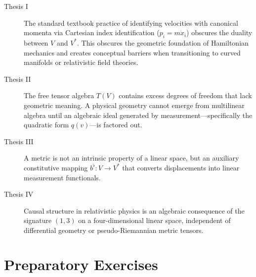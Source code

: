 \documentclass[11pt,a4paper]{article}
\begin{document}
\begin{description}
  \item[Thesis I]
    The standard textbook practice of identifying velocities with canonical
    momenta via Cartesian index identification ($p_i = m \dot{x}_i$) obscures
    the duality between $V$ and $V^*$.
    This obscures the geometric foundation of Hamiltonian mechanics and creates
    conceptual barriers when transitioning to curved manifolds or relativistic
    field theories.

  \item[Thesis II]
    The free tensor algebra $T(V)$ contains excess degrees of freedom that lack
    geometric meaning.
    A physical geometry cannot emerge from multilinear algebra until an
    algebraic ideal generated by measurement---specifically the quadratic form
    $q(v)$---is factored out.

  \item[Thesis III]
    A metric is not an intrinsic property of a linear space, but an auxiliary
    constitutive mapping $b^\flat : V \to V^*$ that converts displacements into
    linear measurement functionals.

  \item[Thesis IV]
    Causal structure in relativistic physics is an algebraic consequence of the
    signature $(1, 3)$ on a four-dimensional linear space, independent of
    differential geometry or pseudo-Riemannian metric tensors.
\end{description}

\section{Preparatory Exercises}
\label{sec:exercises}
\end{document}
